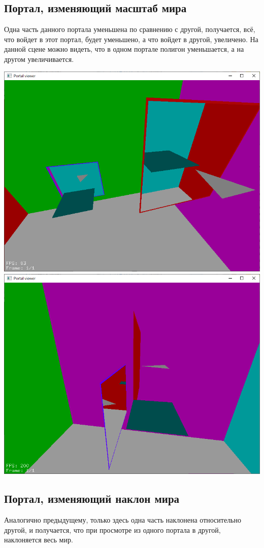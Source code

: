 \subsection{Портал, изменяющий масштаб мира}

Одна часть данного портала уменьшена по сравнению с другой, получается, всё, что войдет в этот портал, будет уменьшено, а что войдет в другой, увеличено. На данной сцене можно видеть, что в одном портале полигон уменьшается, а на другом увеличивается.

\begin{center}
\includegraphics[width=.48\textwidth]{img/15.png}\includegraphics[width=.48\textwidth]{img/16.png}
\end{center}


\subsection{Портал, изменяющий наклон мира}

Аналогично предыдущему, только здесь одна часть наклонена относительно другой, и получается, что при просмотре из одного портала в другой, наклоняется весь мир.

